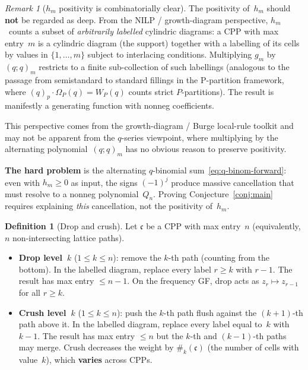 \documentclass[11pt]{article}
\theoremstyle{plain}
\theoremstyle{definition}
\newtheorem{definition}[theorem]{Definition}
\theoremstyle{remark}
\newtheorem{remark}[theorem]{Remark}
\newcommand{\qpochn}[3]{(#1;#2)_{#3}}
\begin{document}
\begin{remark}[$h_m$ positivity is combinatorially clear]\label{rem:hm-trivial}
  The positivity of~$h_m$ should \textbf{not} be regarded as deep.
  From the NILP / growth-diagram perspective, $h_m$~counts a
  subset of \emph{arbitrarily labelled} cylindric diagrams:
  a CPP with max entry~$m$ is a cylindric diagram (the support)
  together with a labelling of its cells by values in
  $\{1,\ldots,m\}$ subject to interlacing conditions.
  Multiplying $g_m$ by~$\qpochn{q}{q}{m}$ restricts to
  a finite sub-collection of such labellings (analogous to
  the passage from semistandard to standard fillings in the
  P-partition framework, where $(q)_p \cdot \Omega_P(q) = W_P(q)$
  counts strict $P$-partitions).
  The result is manifestly a generating function with nonneg
  coefficients.

  This perspective comes from the growth-diagram / Burge
  local-rule toolkit and may not be apparent from the
  $q$-series viewpoint, where multiplying by the alternating
  polynomial~$\qpochn{q}{q}{m}$ has no obvious reason to
  preserve positivity.

  \textbf{The hard problem} is the alternating $q$-binomial
  sum~\eqref{eq:q-binom-forward}: even with $h_m \geq 0$
  as input, the signs $(-1)^j$ produce massive cancellation
  that must resolve to a nonneg polynomial~$Q_n$.
  Proving Conjecture~\ref{conj:main} requires explaining
  \emph{this} cancellation, not the positivity of~$h_m$.
\end{remark}

\begin{definition}[Drop and crush]\label{def:crush-drop}
Let $\mathfrak{c}$ be a CPP with max entry~$n$
(equivalently, $n$ non-intersecting lattice paths).
\begin{itemize}
\item \textbf{Drop level~$k$} ($1 \leq k \leq n$):
  remove the $k$-th path (counting from the bottom).
  In the labelled diagram, replace every label $r \geq k$
  with $r - 1$.
  The result has max entry $\leq n-1$.
  On the frequency GF, drop acts as
  $z_r \mapsto z_{r-1}$ for all $r \geq k$.
\item \textbf{Crush level~$k$} ($1 \leq k \leq n$):
  push the $k$-th path flush against the $(k+1)$-th path above it.
  In the labelled diagram, replace every label equal to~$k$ with $k-1$.
  The result has max entry $\leq n$ but the $k$-th and
  $(k-1)$-th paths may merge.
  Crush decreases the weight by $\#_k(\mathfrak{c})$
  (the number of cells with value~$k$), which \textbf{varies}
  across CPPs.
\end{itemize}
\end{definition}
\end{document}
